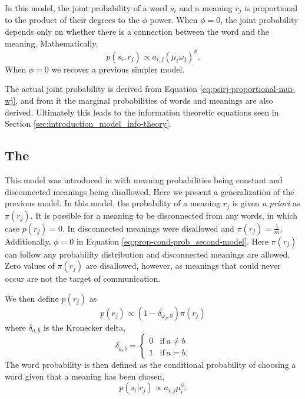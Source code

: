 In this model, the joint probability of a word $s_i$ and a meaning $r_j$ is proportional to the product of their degrees to the $\phi$ power.
When $\phi=0$, the joint probability depends only on whether there is a connection between the word and the meaning.
Mathematically,
\begin{equation*}
  \label{eq:psirj-proportional-mui-wj}
  p(s_i, r_j) \propto a_{i,j} (\mu_i \omega_j)^\phi.
\end{equation*}
When $\phi=0$ we recover a previous simpler model. \cite{Ferrer2005a}

The actual joint probability is derived from Equation \eqref{eq:psirj-proportional-mui-wj}, and from it the marginal probabilities of words and meanings are also derived.
Ultimately this leads to the information theoretic equations seen in Section \ref{sec:introduction_model_info-theory}.

\subsection{The \secondmodel{}}
\label{sec:introduction_model_second-model}

This model was introduced in \cite{Ferrer2003a} with meaning probabilities being constant and disconnected meanings being disallowed.
Here we present a generalization of the previous model.
In this model, the probability of a meaning $r_j$ is given \emph{a priori} as $\pi(r_j)$.
It is possible for a meaning to be disconnected from any words, in which case $p(r_j) = 0$.
In \cite{Ferrer2003a} disconnected meanings were disallowed and $\pi(r_j) = \frac{1}{m}$.
Additionally, $\phi=0$ in Equation \eqref{eq:prop-cond-prob_second-model}.
Here $\pi(r_j)$ can follow any probability distribution and disconnected meanings are allowed.
Zero values of $\pi(r_j)$ are disallowed, however, as meanings that could never occur are not the target of communication.

We then define $p(r_j)$ as
\begin{equation}
  \label{eq:prj-proportional-pirj}
  p(r_j) \propto (1 - \delta_{\omega_j,0}) \pi(r_j)
\end{equation}
where $\delta_{a,b}$ is the Kronecker delta,
\begin{equation*}
  \delta_{a,b} = \begin{cases}
    0 & \text{if}~a \neq b \\
    1 & \text{if}~a = b.
  \end{cases}
\end{equation*}
The word probability is then defined as the conditional probability of choosing a word given that a meaning has been chosen,
\begin{equation}
  \label{eq:prop-cond-prob_second-model}
  p(s_i | r_j) \propto a_{i,j} \mu_i^\phi.
\end{equation}


